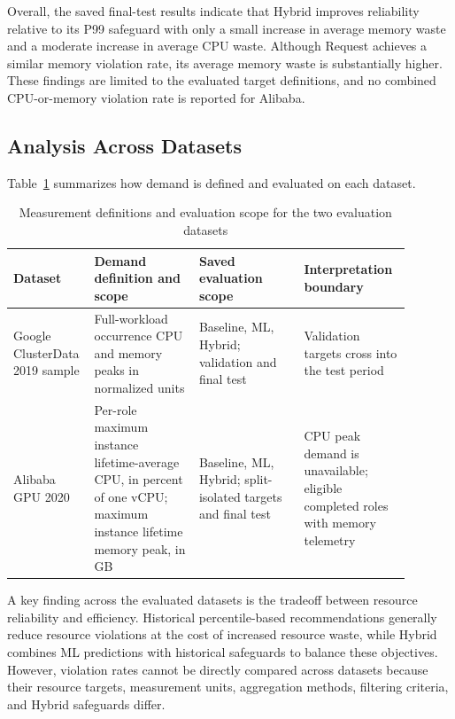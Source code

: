 Overall, the saved final-test results indicate that Hybrid improves reliability relative to its P99 safeguard with only a small increase in average memory waste and a moderate increase in average CPU waste. Although Request achieves a similar memory violation rate, its average memory waste is substantially higher. These findings are limited to the evaluated target definitions, and no combined CPU-or-memory violation rate is reported for Alibaba.

\subsection{Analysis Across Datasets}\label{sec:7.4}

Table~\ref{tab:7.4} summarizes how demand is defined and evaluated on each dataset.

\begin{table}[!t]
\centering
\footnotesize
\caption{Measurement definitions and evaluation scope for the two evaluation datasets}\label{tab:7.4}
\begin{tabular}{>{\raggedright\arraybackslash}p{0.119\linewidth}>{\raggedright\arraybackslash}p{0.258\linewidth}>{\raggedright\arraybackslash}p{0.254\linewidth}>{\raggedright\arraybackslash}p{0.258\linewidth}}
\hline
\textbf{Dataset} & \textbf{Demand definition and scope} & \textbf{Saved evaluation scope} & \textbf{Interpretation boundary} \\ \hline
Google ClusterData 2019 sample & Full-workload occurrence CPU and memory peaks in normalized units & Baseline, ML, Hybrid; validation and final test & Validation targets cross into the test period \\
Alibaba GPU 2020 & Per-role maximum instance lifetime-average CPU, in percent of one vCPU; maximum instance lifetime memory peak, in GB & Baseline, ML, Hybrid; split-isolated targets and final test & CPU peak demand is unavailable; eligible completed roles with memory telemetry \\
\hline
\end{tabular}
\end{table}

A key finding across the evaluated datasets is the tradeoff between resource reliability and efficiency. Historical percentile-based recommendations generally reduce resource violations at the cost of increased resource waste, while Hybrid combines ML predictions with historical safeguards to balance these objectives. However, violation rates cannot be directly compared across datasets because their resource targets, measurement units, aggregation methods, filtering criteria, and Hybrid safeguards differ.

